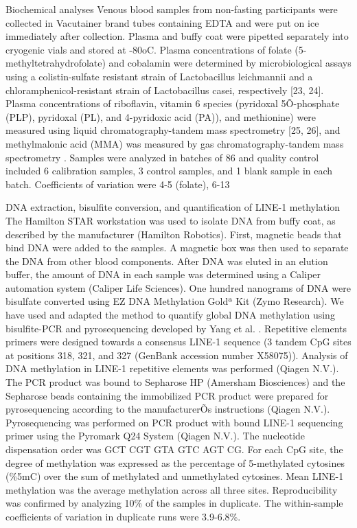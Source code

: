 Biochemical analyses 
Venous blood samples from non-fasting participants were collected in Vacutainer brand tubes containing EDTA and were put on ice immediately after collection. Plasma and buffy coat were pipetted separately into cryogenic vials and stored at -80oC. Plasma concentrations of folate (5-methyltetrahydrofolate) and cobalamin were determined by microbiological assays using a colistin-sulfate resistant strain of Lactobacillus leichmannii and a chloramphenicol-resistant strain of Lactobacillus casei, respectively [23, 24]. Plasma concentrations of riboflavin, vitamin 6 species (pyridoxal 5Õ-phosphate (PLP), pyridoxal (PL), and 4-pyridoxic acid (PA)), and methionine) were measured using liquid chromatography-tandem mass spectrometry [25, 26], and methylmalonic acid (MMA) was measured by gas chromatography-tandem mass spectrometry \cite{c327}. Samples were analyzed in batches of 86 and quality control included 6 calibration samples, 3 control samples, and 1 blank sample in each batch. Coefficients of variation were 4-5%
(folate), 6-13%
 
DNA extraction, bisulfite conversion, and quantification of LINE-1 methylation 
The Hamilton STAR workstation was used to isolate DNA from buffy coat, as described by the manufacturer (Hamilton Robotics). First, magnetic beads that bind DNA were added to the samples. A magnetic box was then used to separate the DNA from other blood components. After DNA was eluted in an elution buffer, the amount of DNA in each sample was determined using a Caliper automation system (Caliper Life Sciences). One hundred nanograms of DNA were bisulfate converted using EZ DNA Methylation Goldª Kit (Zymo Research). We have used and adapted the method to quantify global DNA methylation using bisulfite-PCR and pyrosequencing developed by Yang et al. \cite{c328}. Repetitive elements primers were designed towards a consensus LINE-1 sequence (3 tandem CpG sites at positions 318, 321, and 327 (GenBank accession number X58075)). Analysis of DNA methylation in LINE-1 repetitive elements was performed (Qiagen N.V.). The PCR product was bound to Sepharose HP (Amersham Biosciences) and the Sepharose beads containing 
the immobilized PCR product were prepared for pyrosequencing according to the manufacturerÕs instructions (Qiagen N.V.). Pyrosequencing was performed on PCR product with bound LINE-1 sequencing primer using the Pyromark Q24 System (Qiagen N.V.). The nucleotide dispensation order was GCT CGT GTA GTC AGT CG. For each CpG site, the degree of methylation was expressed as the percentage of 5-methylated cytosines (\%5mC) over the sum of methylated and unmethylated cytosines. Mean LINE-1 methylation was the average methylation across all three sites. Reproducibility was confirmed by analyzing 10\% of the samples in duplicate. The within-sample coefficients of variation in duplicate runs were 3.9-6.8\%. 
 
